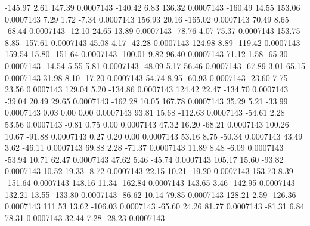      -145.97        2.61      147.39     0.0007143
     -140.42        6.83      136.32     0.0007143
     -160.49       14.55      153.06     0.0007143
        7.29        1.72       -7.34     0.0007143
      156.93       20.16     -165.02     0.0007143
       70.49        8.65      -68.44     0.0007143
      -12.10       24.65       13.89     0.0007143
      -78.76        4.07       75.37     0.0007143
      153.75        8.85     -157.61     0.0007143
       45.08        4.17      -42.28     0.0007143
      124.98        8.89     -119.42     0.0007143
      159.54       15.80     -151.64     0.0007143
     -100.01        9.82       96.40     0.0007143
       71.12        1.58      -65.30     0.0007143
      -14.54        5.55        5.81     0.0007143
      -48.09        5.17       56.46     0.0007143
      -67.89        3.01       65.15     0.0007143
       31.98        8.10      -17.20     0.0007143
       54.74        8.95      -60.93     0.0007143
      -23.60        7.75       23.56     0.0007143
      129.04        5.20     -134.86     0.0007143
      124.42       22.47     -134.70     0.0007143
      -39.04       20.49       29.65     0.0007143
     -162.28       10.05      167.78     0.0007143
       35.29        5.21      -33.99     0.0007143
        0.03        0.00        0.00     0.0007143
       93.81       15.68     -112.63     0.0007143
      -54.61        2.28       53.56     0.0007143
       -0.81        0.75        0.00     0.0007143
       47.32       16.20      -68.21     0.0007143
      100.26       10.67      -91.88     0.0007143
        0.27        0.20        0.00     0.0007143
       53.16        8.75      -50.34     0.0007143
       43.49        3.62      -46.11     0.0007143
       69.88        2.28      -71.37     0.0007143
       11.89        8.48       -6.09     0.0007143
      -53.94       10.71       62.47     0.0007143
       47.62        5.46      -45.74     0.0007143
      105.17       15.60      -93.82     0.0007143
       10.52       19.33       -8.72     0.0007143
       22.15       10.21      -19.20     0.0007143
      153.73        8.39     -151.64     0.0007143
      148.16       11.34     -162.84     0.0007143
      143.65        3.46     -142.95     0.0007143
      132.21       13.55     -133.80     0.0007143
      -86.62       10.14       79.85     0.0007143
      128.21        2.59     -126.36     0.0007143
      111.53       13.62     -106.03     0.0007143
      -65.60       24.26       81.77     0.0007143
      -81.31        6.84       78.31     0.0007143
       32.44        7.28      -28.23     0.0007143
